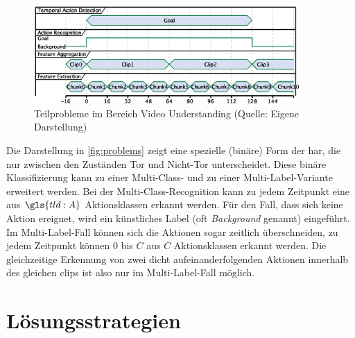 \begin{figure}[htbp]
    \centering
    \includegraphics[width=0.9\textwidth, height=0.9\textwidth, keepaspectratio, interpolate]{fig/problems.eps}
    \caption[Teilprobleme im Bereich Video Understanding]{Teilprobleme im Bereich Video Understanding (Quelle: Eigene Darstellung)}
    \label{fig:problems}
\end{figure}

Die Darstellung in \autoref{fig:problems} zeigt eine spezielle (binäre) Form der \gls{har}, die nur zwischen den Zuständen Tor und Nicht-Tor unterscheidet.
Diese binäre Klassifizierung kann zu einer Multi-Class- und zu einer Multi-Label-Variante erweitert werden.
Bei der Multi-Class-Recognition kann zu jedem Zeitpunkt eine aus $\gls{tld:A}$ Aktionsklassen erkannt werden.
Für den Fall, dass sich keine Aktion ereignet, wird ein künstliches Label (oft \emph{Background} genannt) eingeführt.
Im Multi-Label-Fall können sich die Aktionen sogar zeitlich überschneiden, \dh zu jedem Zeitpunkt können $0$ bis $C$ aus $C$ Aktionsklassen erkannt werden.
Die gleichzeitige Erkennung von zwei dicht aufeinanderfolgenden Aktionen innerhalb des gleichen \glspl{clip} ist also nur im Multi-Label-Fall möglich.


\section{Lösungsstrategien}
\label{sec:loesungsstrategien}

